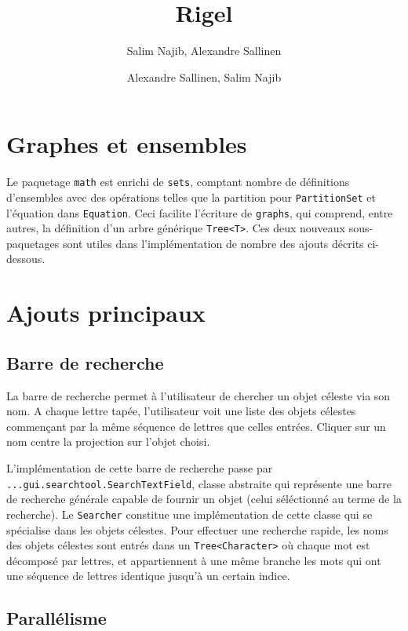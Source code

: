 \documentclass[10pt,a4paper]{report}
\author{Salim Najib, Alexandre Sallinen}
\title{Rigel}
\author{Alexandre Sallinen, Salim Najib}
\begin{document}
\newcommand{\code}[1]{\texttt{#1}}

\section*{}

\section*{Graphes et ensembles}

Le paquetage \code{math} est enrichi de \code{sets}, comptant nombre de définitions d'ensembles avec des opérations telles que la partition pour \code{PartitionSet} et l'équation dans \code{Equation}. Ceci facilite l'écriture de \code{graphs}, qui comprend, entre autres, la définition d'un arbre générique \code{Tree<T>}. Ces deux nouveaux sous-paquetages sont utiles dans l'implémentation de nombre des ajouts décrits ci-dessous.

\section*{Ajouts principaux}

\subsection*{Barre de recherche}

La barre de recherche permet à l'utilisateur de chercher un objet céleste via son nom. A chaque lettre tapée, l'utilisateur voit une liste des objets célestes commençant par la même séquence de lettres que celles entrées. Cliquer sur un nom centre la projection sur l'objet choisi.

L'implémentation de cette barre de recherche passe par \linebreak\code{...gui.searchtool.SearchTextField}, classe abstraite qui représente une barre de recherche générale capable de fournir un objet (celui séléctionné au terme de la recherche). Le \code{Searcher} constitue une implémentation de cette classe qui se spécialise dans les objets célestes. Pour effectuer une recherche rapide, les noms des objets célestes sont entrés dans un \code{Tree<Character>} où chaque mot est décomposé par lettres, et appartiennent à une même branche les mots qui ont une séquence de lettres identique jusqu'à un certain indice.

\subsection*{Parallélisme}
\end{document}
